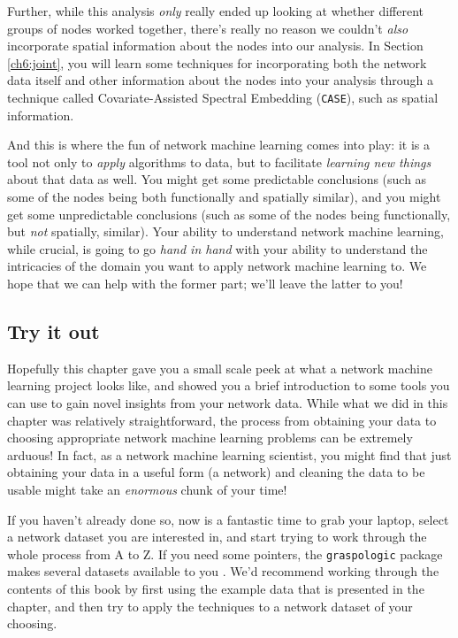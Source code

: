 Further, while this analysis \emph{only} really ended up looking at whether different groups of nodes worked together, there's really no reason we couldn't \emph{also} incorporate spatial information about the nodes into our analysis. In Section \ref{ch6:joint}, you will learn some techniques for incorporating both the network data itself and other information about the nodes into your analysis through a technique called Covariate-Assisted Spectral Embedding (\texttt{CASE}), such as spatial information.

And this is where the fun of network machine learning comes into play: it is a tool not only to \emph{apply} algorithms to data, but to facilitate \emph{learning new things} about that data as well. You might get some predictable conclusions (such as some of the nodes being both functionally and spatially similar), and you might get some unpredictable conclusions (such as some of the nodes being functionally, but \emph{not} spatially, similar). Your ability to understand network machine learning, while crucial, is going to go \emph{hand in hand} with your ability to understand the intricacies of the domain you want to apply network machine learning to. We hope that we can help with the former part; we'll leave the latter to you!

\subsection{Try it out}

Hopefully this chapter gave you a small scale peek at what a network machine learning project looks like, and showed you a brief introduction to some tools you can use to gain novel insights from your network data. While what we did in this chapter was relatively straightforward, the process from obtaining your data to choosing appropriate network machine learning problems can be extremely arduous! In fact, as a network machine learning scientist, you might find that just obtaining your data in a useful form (a network) and cleaning the data to be usable might take an \emph{enormous} chunk of your time!

If you haven't already done so, now is a fantastic time to grab your laptop, select a network dataset you are interested in, and start trying to work through the whole process from A to Z. If you need some pointers, the \texttt{graspologic} package makes several datasets available to you \cite{graspydata}. We'd recommend working through the contents of this book by first using the example data that is presented in the chapter, and then try to apply the techniques to a network dataset of your choosing.